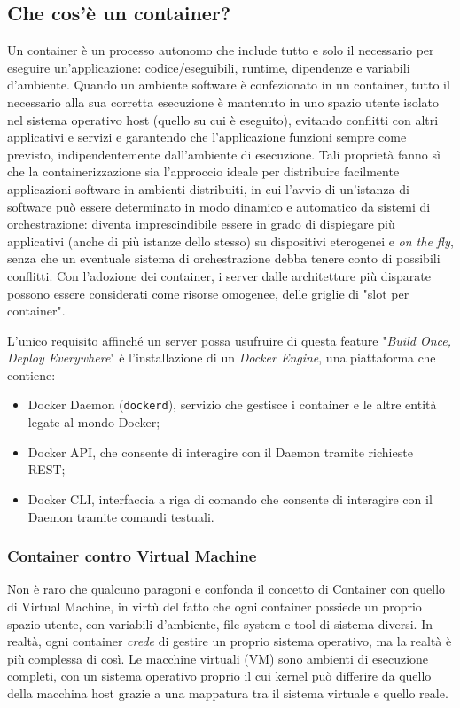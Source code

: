 \subsection{Che cos'è un container?}
Un container è un processo autonomo che include tutto e solo il necessario per eseguire un'applicazione: codice/eseguibili, runtime, dipendenze e variabili d'ambiente. Quando un ambiente software è confezionato in un container, tutto il necessario alla sua corretta esecuzione è mantenuto in uno spazio utente isolato nel sistema operativo host (quello su cui è eseguito), evitando conflitti con altri applicativi e servizi e garantendo che l'applicazione funzioni sempre come previsto, indipendentemente dall'ambiente di esecuzione.
Tali proprietà fanno sì che la containerizzazione sia l'approccio ideale per distribuire facilmente applicazioni software in ambienti distribuiti, in cui l'avvio di un'istanza di software può essere determinato in modo dinamico e automatico da sistemi di orchestrazione: diventa imprescindibile essere in grado di dispiegare più applicativi (anche di più istanze dello stesso) su dispositivi eterogenei e \emph{on the fly}, senza che un eventuale sistema di orchestrazione debba tenere conto di possibili conflitti. Con l'adozione dei container, i server dalle architetture più disparate possono essere considerati come risorse omogenee, delle griglie di "slot per container".

L'unico requisito affinché un server possa usufruire di questa feature "\emph{Build Once, Deploy Everywhere}" è l'installazione di un \emph{Docker Engine}, una piattaforma che contiene:
\begin{itemize}
    \item Docker Daemon (\texttt{dockerd}), servizio che gestisce i container e le altre entità legate al mondo Docker;
    \item Docker API, che consente di interagire con il Daemon tramite richieste REST;
    \item Docker CLI, interfaccia a riga di comando che consente di interagire con il Daemon tramite comandi testuali.
\end{itemize}

\subsubsection{Container contro Virtual Machine}
Non è raro che qualcuno paragoni e confonda il concetto di Container con quello di Virtual Machine, in virtù del fatto che ogni container possiede un proprio spazio utente, con variabili d'ambiente, file system e tool di sistema diversi. In realtà, ogni container \emph{crede} di gestire un proprio sistema operativo, ma la realtà è più complessa di così.
Le macchine virtuali (VM) sono ambienti di esecuzione completi, con un sistema operativo proprio il cui kernel può differire da quello della macchina host grazie a una mappatura tra il sistema virtuale e quello reale.

